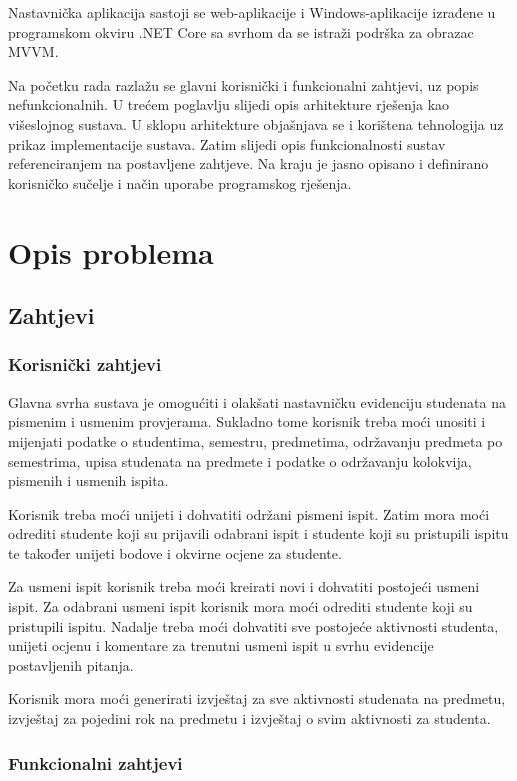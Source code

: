 \documentclass[times, utf8, diplomski]{fer}
\begin{document}
Nastavnička aplikacija sastoji se web-aplikacije i Windows-aplikacije izrađene u programskom okviru .NET Core sa svrhom da se istraži podrška za obrazac MVVM.

Na početku rada razlažu se glavni korisnički i funkcionalni zahtjevi, uz popis nefunkcionalnih. U trećem poglavlju slijedi opis arhitekture rješenja kao višeslojnog sustava. U sklopu arhitekture objašnjava se i korištena tehnologija uz prikaz implementacije sustava. Zatim slijedi opis funkcionalnosti sustav referenciranjem na postavljene zahtjeve. Na kraju je jasno opisano i definirano korisničko sučelje i način uporabe programskog rješenja.

\chapter{Opis problema}
\section{Zahtjevi}

\subsection{Korisnički zahtjevi}

Glavna svrha sustava je omogućiti i olakšati nastavničku evidenciju studenata na pismenim i usmenim provjerama. Sukladno tome korisnik treba moći unositi i mijenjati podatke o studentima, semestru, predmetima, održavanju predmeta po semestrima, upisa studenata na predmete i podatke o održavanju kolokvija, pismenih i usmenih ispita. 

Korisnik treba moći unijeti i dohvatiti održani pismeni ispit. Zatim mora moći odrediti studente koji su prijavili odabrani ispit i studente koji su pristupili ispitu te također unijeti bodove i okvirne ocjene za studente. 

Za usmeni ispit korisnik treba moći kreirati novi i dohvatiti postojeći usmeni ispit. Za odabrani usmeni ispit korisnik mora moći odrediti studente koji su pristupili ispitu. Nadalje treba moći dohvatiti sve postojeće aktivnosti studenta, unijeti ocjenu i komentare za trenutni usmeni ispit u svrhu evidencije postavljenih pitanja.

Korisnik mora moći generirati izvještaj za sve aktivnosti studenata na predmetu, izvještaj za pojedini rok na predmetu i izvještaj o svim aktivnosti za studenta.

\subsection{Funkcionalni zahtjevi}
\end{document}
